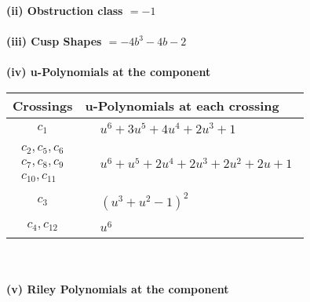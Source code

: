 \documentclass[1p]{elsarticle_modified}
\theoremstyle{definition}
\begin{document}
\flushleft \textbf{(ii) Obstruction class $= -1$}\\~\\
\flushleft \textbf{(iii) Cusp Shapes $= -4 b^3-4 b-2$}\\~\\
\newpage\renewcommand{\arraystretch}{1}
\flushleft \textbf{(iv) u-Polynomials at the component}\newline \\
\begin{tabular}{m{50pt}|m{274pt}}
Crossings & \hspace{64pt}u-Polynomials at each crossing \\
\hline $$\begin{aligned}c_{1}\end{aligned}$$&$\begin{aligned}
&u^6+3 u^5+4 u^4+2 u^3+1
\end{aligned}$\\
\hline $$\begin{aligned}c_{2},c_{5},c_{6}\\c_{7},c_{8},c_{9}\\c_{10},c_{11}\end{aligned}$$&$\begin{aligned}
&u^6+u^5+2 u^4+2 u^3+2 u^2+2 u+1
\end{aligned}$\\
\hline $$\begin{aligned}c_{3}\end{aligned}$$&$\begin{aligned}
&(u^3+u^2-1)^2
\end{aligned}$\\
\hline $$\begin{aligned}c_{4},c_{12}\end{aligned}$$&$\begin{aligned}
&u^6
\end{aligned}$\\
\hline
\end{tabular}\\~\\
\newpage\renewcommand{\arraystretch}{1}
\flushleft \textbf{(v) Riley Polynomials at the component}\newline \\
\end{document}
